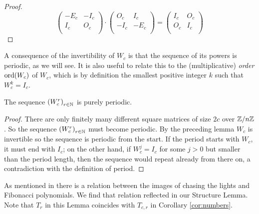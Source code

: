 \begin{proof}
  \[
  \left(
  \begin{matrix}
    -E_c & -I_c \\
    I_c & O_c \\
  \end{matrix}
  \right)
  \cdot
  \left(
  \begin{matrix}
    O_c & I_c  \\
    -I_c & -E_c \\
  \end{matrix}
  \right)
  =
  \left(
  \begin{matrix}
    I_c & O_c \\
    O_c & I_c \\
  \end{matrix}
  \right)
  \]
\end{proof}
%
A consequence of the invertibility of $W_{c}$ is that the sequence of its powers
is periodic, as we will see. It is also useful to relate this to the
(multiplicative) {\it order} $\operatorname{ord}(W_c)$ of $W_c$,
which is by definition the smallest
positive integer $k$ such that $W_c^k=I_c$.

\begin{theorem}\label{thm:Wperiod}
The sequence %
$\left(W_{c}^{r}\right)_{r\in\mathbb{N}}$ is purely periodic.
\end{theorem}

\begin{proof}
  There are only finitely many different square matrices of size $2c$ over
  $\mathbb{Z}/n\mathbb{Z}$. So the sequence $\left(W_{c}^{r}\right)_{r\in\mathbb{N}}$ must
  become periodic. By the preceding lemma $W_{c}$ is invertible so the
  sequence is periodic from the start. If the period starts with $W_c$, it
  must end with $I_c$; on the other hand, if $W_c^j=I_c$ for some $j>0$ 
  but smaller than the period length, then the sequence would repeat 
  already from there on, a contradiction with the definition of period.
\end{proof}
%
As mentioned in \cite{leach17} there is a relation between the images of chasing
the lights and Fibonacci polynomials. We find that relation reflected in our
Structure Lemma. Note that $T_r$ in this Lemma coincides with
$T_{c,r}$ in Corollary \ref{cor:numbers}.


